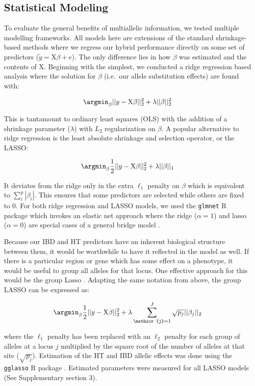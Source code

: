\begin{refsection}
\subsection{Statistical Modeling}\label{statistical-modeling}

To evaluate the general benefits of multiallelic information, we tested
multiple modelling frameworks. All models here are extensions of
the standard shrinkage-based methods where we regress our hybrid
performance directly on some set of predictors
(\(\tilde{y} = \mathrm{X}\beta + e\)). The only difference lies in how
\(\beta\) was estimated and the contents of \(\mathrm{X}\). Beginning
with the simplest, we conducted a ridge regression based analysis where
the solution for \(\beta\) (i.e.~our allele substitution effects) are found
with:

\[\argmin_{\beta} ||y - \mathrm{X}\beta||^2_2 + \lambda ||\beta||^2_2\]

This is tantamount to ordinary least squares (OLS) with the addition of
a shrinkage parameter (\(\lambda\)) with \(L_2\) regularization on
\(\beta\). A popular alternative to ridge regression is the least
absolute shrinkage and selection operator, or the LASSO:

\[\argmin_{\beta} \frac{1}{2} ||y - \mathrm{X}\beta||^2_2 + \lambda  ||\beta||_1\]

It deviates from the ridge only in the extra \(\ell_1\) penalty on \(\beta\)
which is equivalent to \(\sum^p_i |\beta_i|\). This ensures that some predictors are selected while others are fixed to 0. For both ridge regression and LASSO models, we used the
\texttt{glmnet} R package which invokes an elastic net approach where
the ridge (\(\alpha = 1\)) and lasso (\(\alpha = 0\)) are special cases
of a general bridge model \parencite{Friedman2010}.

Because our IBD and HT predictors have an inherent biological structure
between them, it would be worthwhile to have it reflected in the model
as well. If there is a particular region or gene which has some
effect on a phenotype, it would be useful to group all alleles for that
locus. One effective approach for this would be the group Lasso
\parencite{Ogutu2014}. Adapting the same notation from above, the group
LASSO can be expressed as:

\[\argmin_{\beta} \frac{1}{2} ||y - \mathrm{X}\beta||^2_2 + \lambda \sum_{\mathscr{j} = 1}^J \sqrt{p_j}||\beta_j||_2\]

where the \(\ell_1\) penalty has been replaced with an \(\ell_2\)
penalty for each group of alleles at a locus \(j\) multiplied by the
square root of the number of alleles at that site (\(\sqrt{p_j}\)).
Estimation of the HT and IBD allelic effects
was done using the \texttt{gglasso} R package \parencite{Yang2015}. Estimated parameters were measured for all LASSO models (See Supplementary section 3).


\end{refsection}
